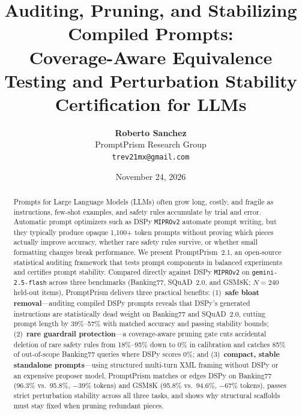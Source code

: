 \documentclass[11pt,a4paper]{article}
\title{\textbf{Auditing, Pruning, and Stabilizing Compiled Prompts:}\\
\large Coverage-Aware Equivalence Testing and Perturbation Stability Certification for LLMs}
\author{\textbf{Roberto Sanchez}\\PromptPrism Research Group\\\texttt{trev21mx@gmail.com}}
\date{November 24, 2026}
\newcommand{\method}{PromptPrism}
\begin{document}
\setlength{\emergencystretch}{2.5em}
\maketitle

\begin{abstract}
Prompts for Large Language Models (LLMs) often grow long, costly, and fragile as instructions, few-shot examples, and safety rules accumulate by trial and error. Automatic prompt optimizers such as DSPy \texttt{MIPROv2} automate prompt writing, but they typically produce opaque 1,100+ token prompts without proving which pieces actually improve accuracy, whether rare safety rules survive, or whether small formatting changes break performance. We present \method{}~2.1, an open-source statistical auditing framework that tests prompt components in balanced experiments and certifies prompt stability. Compared directly against DSPy \texttt{MIPROv2} on \texttt{gemini-2.5-flash} across three benchmarks (Banking77, SQuAD~2.0, and GSM8K; $N=240$ held-out items), \method{} delivers three practical benefits: (1)~\textbf{safe bloat removal}---auditing compiled DSPy prompts reveals that DSPy's generated instructions are statistically dead weight on Banking77 and SQuAD~2.0, cutting prompt length by 39\%--57\% with matched accuracy and passing stability bounds; (2)~\textbf{rare guardrail protection}---a coverage-aware pruning gate cuts accidental deletion of rare safety rules from 18\%--95\% down to 0\% in calibration and catches 85\% of out-of-scope Banking77 queries where DSPy scores 0\%; and (3)~\textbf{compact, stable standalone prompts}---using structured multi-turn XML framing without DSPy or an expensive proposer model, \method{} matches or edges DSPy on Banking77 (96.3\% vs.\ 95.8\%, $-39\%$ tokens) and GSM8K (95.8\% vs.\ 94.6\%, $-67\%$ tokens), passes strict perturbation stability across all three tasks, and shows why structural scaffolds must stay fixed when pruning redundant pieces.
\end{abstract}
\end{document}
